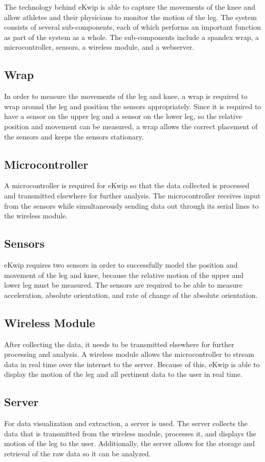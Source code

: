 The technology behind eKwip is able to capture the movements of the knee and allow athletes and their physicians to monitor the motion of the leg. The system consists of several sub-components, each of which performs an important function as part of the system as a whole. The sub-components include a spandex wrap, a microcontroller, sensors, a wireless module, and a webserver.

\subsection {Wrap}
In order to measure the movements of the leg and knee, a wrap is required to wrap around the leg and position the sensors appropriately. Since it is required to have a sensor on the upper leg and a sensor on the lower leg, so the relative position and movement can be measured, a wrap allows the correct placement of the sensors and keeps the sensors stationary.

\subsection {Microcontroller}
A microcontroller is required for eKwip so that the data collected is processed and transmitted elsewhere for further analysis. The microcontroller receives input from the sensors while simultaneously sending data out through its serial lines to the wireless module.

\subsection {Sensors}
eKwip requires two sensors in order to successfully model the position and movement of the leg and knee, because the relative motion of the upper and lower leg must be measured. The sensors are required to be able to measure acceleration, absolute orientation, and rate of change of the absolute orientation.

\subsection {Wireless Module}
After collecting the data, it needs to be transmitted elsewhere for further processing and analysis. A wireless module allows the microcontroller to stream data in real time over the internet to the server. Because of this, eKwip is able to display the motion of the leg and all pertinent data to the user in real time.

\subsection {Server}
For data visualization and extraction, a server is used. The server collects the data that is transmitted from the wireless module, processes it, and displays the motion of the leg to the user. Additionally, the server allows for the storage and retrieval of the raw data so it can be analyzed.

